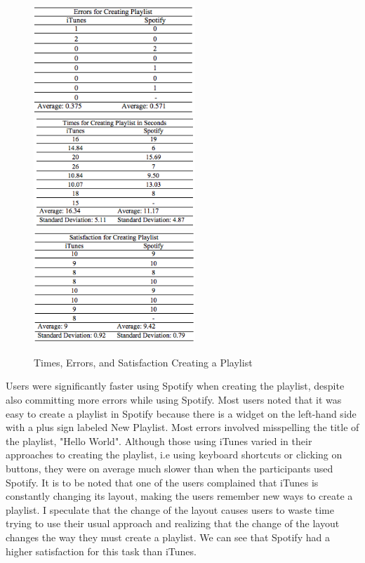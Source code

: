\documentclass[11pt]{article}
\begin{document}
\begin{figure}[H] %
   \centering
   \includegraphics[width=2.4in]{errors_playlist.png}       
   \includegraphics[width=2.4in]{times_playlist.png} 
   \includegraphics[width=2.4in]{satisfaction_playlist.png} 
   \caption{Times, Errors, and Satisfaction Creating a Playlist}
   \label{fig:playlist}
\end{figure}

Users were significantly faster using Spotify when creating the playlist, despite also committing more errors while using Spotify. Most users noted  that it was easy to create a playlist in Spotify because there is a widget on the left-hand side with a plus sign labeled New Playlist. Most errors involved misspelling the title of the playlist, "Hello World". Although those using iTunes varied in their approaches to creating the playlist, i.e using keyboard shortcuts or clicking on buttons, they were on average much slower than when the participants used Spotify. It is to be noted that one of the users complained that iTunes is constantly changing its layout, making the users remember new ways to create a playlist. I speculate that the change of the layout causes users to waste time trying to use their usual approach and realizing that the change of the layout changes the way they must create a playlist. We can see that Spotify had a higher satisfaction for this task than iTunes. 
\end{document}
